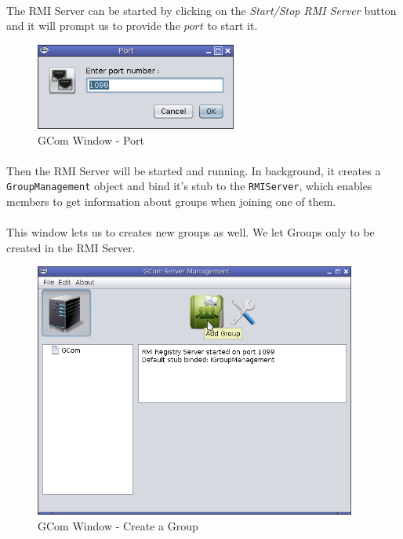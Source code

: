 \documentclass[a4paper,english,twoside]{article}
\begin{document}
\paragraph{}
The RMI Server can be started by clicking on the \textit{Start/Stop RMI Server} button and it will prompt us to provide the $port$ to start it.

\begin{figure}[h]
\begin{center}
\includegraphics[width=250px]{GCom-Port.png}
\caption{GCom Window - Port}
\end{center}
\end{figure}

\paragraph{}
Then the RMI Server will be started and running. In background, it creates a \texttt{GroupManagement} object and bind it's stub to the \texttt{RMIServer}, which enables members to get information about groups when joining one of them.

\paragraph{}
This window lets us to creates new groups as well. We let Groups only to be created in the RMI Server.

\begin{figure}[h]
\begin{center}
\includegraphics[width=400px]{GCom-NewGroup.png}
\caption{GCom Window - Create a Group}
\end{center}
\end{figure}
\newpage
\end{document}
